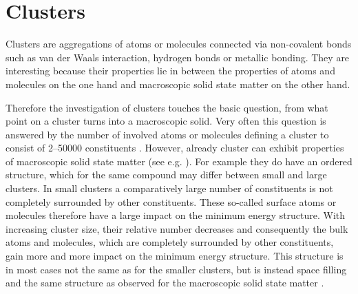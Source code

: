 \chapter{Clusters}
\label{chapter:clusters}

Clusters are aggregations of atoms or molecules connected via non-covalent
bonds such as van der Waals interaction, hydrogen bonds or metallic bonding.
They are interesting
because their properties lie in between the properties of
atoms and molecules on the one hand and macroscopic solid state matter
on the other hand.

Therefore the investigation of clusters touches the basic question, from what point
on a cluster turns into a macroscopic solid.
Very often this question is answered by the number of involved atoms or molecules
defining a cluster to consist of 2--50000 constituents \cite{Bjorneholm09}.
However, already cluster can exhibit properties of macroscopic solid
state matter (see e.g. \cite{Foerstel10}).
For example they do have an ordered structure, which for the same
compound may differ between small and large clusters. In small clusters a
comparatively large number of constituents is not completely surrounded
by other constituents. These so-called surface atoms or molecules therefore
have a large impact on the minimum energy structure. With increasing cluster
size, their relative number decreases and consequently the bulk atoms and molecules,
which are completely surrounded by other constituents,
gain more and more impact on the minimum energy structure. This structure is
in most cases not the same as for the smaller clusters, but is instead
space filling and the
same structure as observed for the macroscopic solid state matter
\cite{Martin96,Hartke02}.

